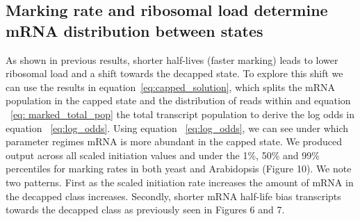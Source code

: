 \documentclass[review]{elsarticle}
\begin{document}
\subsection{Marking rate and ribosomal load determine mRNA distribution between states}
As shown in previous results, shorter half-lives (faster marking) leads to lower ribosomal load and a shift towards the decapped state. To explore this shift we can use the results in equation~\ref{eq:capped_solution}, which splits the mRNA population in the capped state and the distribution of reads within and equation ~\ref{eq:  marked_total_pop} the total transcript population to derive the log odds in equation ~\ref{eq:log_odds}. Using equation ~\ref{eq:log_odds}, we can see under which parameter regimes mRNA is more abundant in the capped state. We produced output across all scaled initiation values and under the 1\%, 50\% and 99\% percentiles for marking rates in both yeast and Arabidopsis (Figure 10). We note two patterns. First as the scaled initiation rate increases the amount of mRNA in the decapped class increases. Secondly, shorter mRNA half-life bias transcripts towards the decapped class as previously seen in Figures 6 and 7.  




\end{document}
